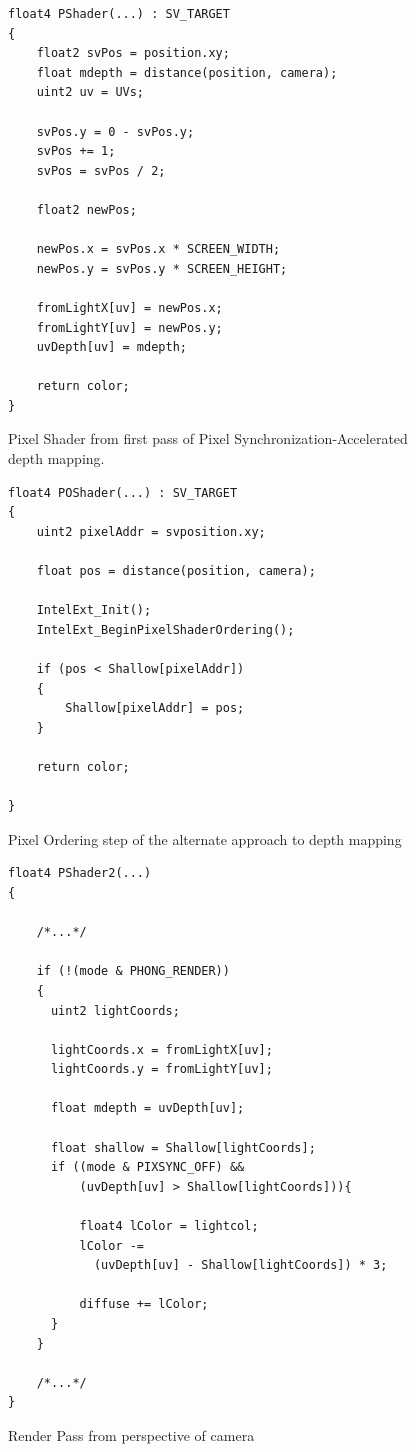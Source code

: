 \documentclass[a4paper, 12pt]{article}
\begin{document}
\begin{figure}[h!]

\begin{lstlisting}[breaklines=true, language=HLSL]
float4 PShader(...) : SV_TARGET 
{
	float2 svPos = position.xy;
	float mdepth = distance(position, camera);
	uint2 uv = UVs;

	svPos.y = 0 - svPos.y;
	svPos += 1;
	svPos = svPos / 2;

	float2 newPos;

	newPos.x = svPos.x * SCREEN_WIDTH;
	newPos.y = svPos.y * SCREEN_HEIGHT;

	fromLightX[uv] = newPos.x;
	fromLightY[uv] = newPos.y;
	uvDepth[uv] = mdepth;

	return color;
}
\end{lstlisting}
\caption{Pixel Shader from first pass of Pixel Synchronization-Accelerated 
depth mapping.}
\label{code:PixelShaderPSDepth}
\end{figure}

\begin{figure}[h!]
\begin{lstlisting}[breaklines=true, language=HLSL]
float4 POShader(...) : SV_TARGET
{
	uint2 pixelAddr = svposition.xy;

	float pos = distance(position, camera);

	IntelExt_Init();
	IntelExt_BeginPixelShaderOrdering();

	if (pos < Shallow[pixelAddr])
	{
		Shallow[pixelAddr] = pos;
	}

	return color;
	
}

\end{lstlisting}
\caption{Pixel Ordering step of the alternate approach to depth mapping}
\label{code:POShader}
\end{figure}

\begin{figure}[h]
\begin{lstlisting}[breaklines=true,language=HLSL]
float4 PShader2(...)
{

	/*...*/

	if (!(mode & PHONG_RENDER))
	{
	  uint2 lightCoords;

	  lightCoords.x = fromLightX[uv];
	  lightCoords.y = fromLightY[uv];

	  float mdepth = uvDepth[uv];

	  float shallow = Shallow[lightCoords];
	  if ((mode & PIXSYNC_OFF) && 
	      (uvDepth[uv] > Shallow[lightCoords])){
		  
		  float4 lColor = lightcol;
		  lColor -= 
		    (uvDepth[uv] - Shallow[lightCoords]) * 3;
			
		  diffuse += lColor;
	  }
	}

	/*...*/
}
\end{lstlisting}

\caption{Render Pass from perspective of camera}
\label{code:PSDepthRender}
\end{figure}
\end{document}

